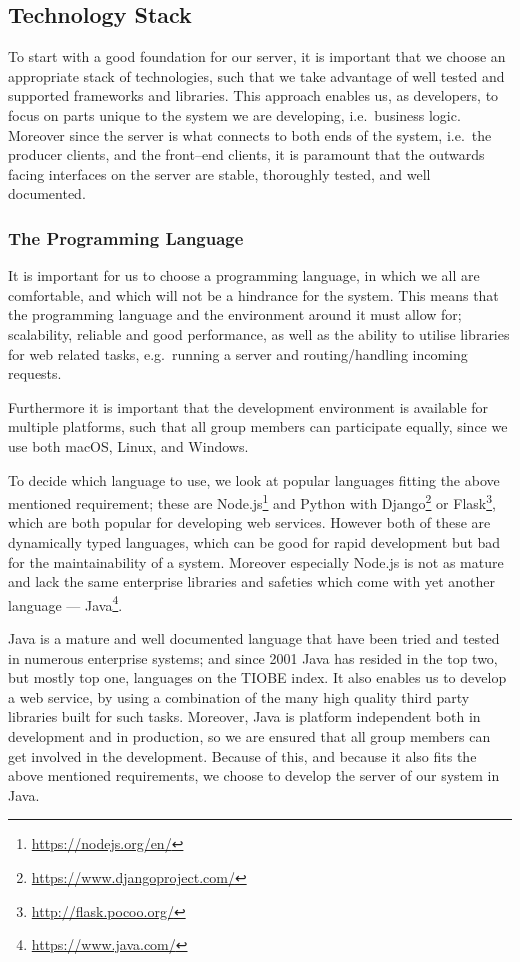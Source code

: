 \subsection{Technology Stack}
To start with a good foundation for our server, it is important that we choose an appropriate stack of technologies, such that we take advantage of well tested and supported frameworks and libraries.
This approach enables us, as developers, to focus on parts unique to the system we are developing, i.e.~business logic.
Moreover since the server is what connects to both ends of the system, i.e.~the producer clients, and the front--end clients, it is paramount that the outwards facing interfaces on the server are stable, thoroughly tested, and well documented.

\subsubsection{The Programming Language}
It is important for us to choose a programming language, in which we all are comfortable, and which will not be a hindrance for the system.
This means that the programming language and the environment around it must allow for; scalability, reliable and good performance, as well as the ability to utilise libraries for web related tasks, e.g.~running a server and routing/handling incoming requests.

Furthermore it is important that the development environment is available for multiple platforms, such that all group members can participate equally, since we use both macOS, Linux, and Windows.

\bigskip
To decide which language to use, we look at popular languages fitting the above mentioned requirement;
these are Node.js\footnote{\url{https://nodejs.org/en/}} and Python with Django\footnote{\url{https://www.djangoproject.com/}} or Flask\footnote{\url{http://flask.pocoo.org/}}, which are both popular for developing web services.
However both of these are dynamically typed languages, which can be good for rapid development but bad for the maintainability of a system\cite{kleinschmager2012static}.
Moreover especially Node.js is not as mature and lack the same enterprise libraries and safeties which come with yet another language --- Java\footnote{\url{https://www.java.com/}}.

Java is a mature and well documented language that have been tried and tested in numerous enterprise systems; and since 2001 Java has resided in the top two, but mostly top one, languages on the TIOBE index\cite{TiobeIndex}.
It also enables us to develop a web service, by using a combination of the many high quality third party libraries built for such tasks.
Moreover, Java is platform independent both in development and in production, so we are ensured that all group members can get involved in the development.
Because of this, and because it also fits the above mentioned requirements, we choose to develop the server of our system in Java.

